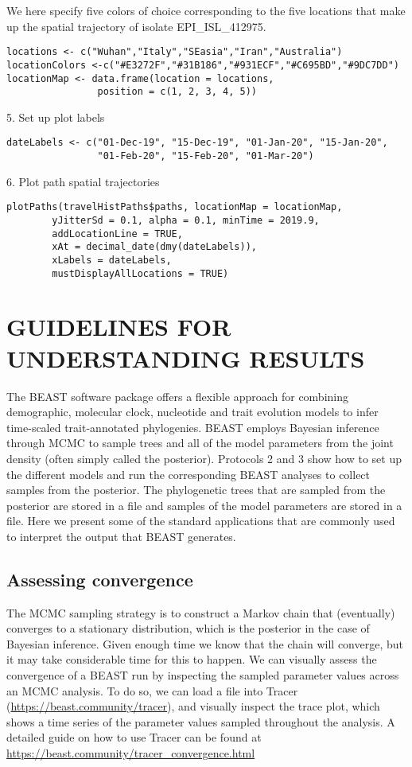 \documentclass{article}
\newcommand{\code}[1]{
{\upshape\ttfamily{#1}}}
\begin{document}
We here specify five colors of choice corresponding to the five locations that make up the spatial trajectory of isolate EPI\_ISL\_412975.

\begin{verbatim}
locations <- c("Wuhan","Italy","SEasia","Iran","Australia")
locationColors <-c("#E3272F","#31B186","#931ECF","#C695BD","#9DC7DD")
locationMap <- data.frame(location = locations,
                position = c(1, 2, 3, 4, 5))
\end{verbatim}

5. Set up plot labels
\begin{verbatim}
dateLabels <- c("01-Dec-19", "15-Dec-19", "01-Jan-20", "15-Jan-20",
                "01-Feb-20", "15-Feb-20", "01-Mar-20")
\end{verbatim}

6. Plot path spatial trajectories
\begin{verbatim}
plotPaths(travelHistPaths$paths, locationMap = locationMap,
        yJitterSd = 0.1, alpha = 0.1, minTime = 2019.9,
        addLocationLine = TRUE,
        xAt = decimal_date(dmy(dateLabels)),
        xLabels = dateLabels,
        mustDisplayAllLocations = TRUE)
\end{verbatim}

\section*{GUIDELINES FOR UNDERSTANDING RESULTS}

The BEAST software package offers a flexible approach for combining demographic, molecular clock, nucleotide and trait evolution models to infer time-scaled trait-annotated phylogenies.
BEAST employs Bayesian inference through MCMC to sample trees and all of the model parameters from the joint density (often simply called the posterior).
Protocols 2 and 3 show how to set up the different models and run the corresponding BEAST analyses to collect samples from the posterior.
The phylogenetic trees that are sampled from the posterior are stored in a\code{.trees} file and samples of the model parameters are stored in a\code{.log} file.
Here we present some of the standard applications that are commonly used to interpret the output that BEAST generates.

\subsection*{Assessing convergence}

The MCMC sampling strategy is to construct a Markov chain that (eventually) converges to a stationary distribution, which is the posterior in the case of Bayesian inference.
Given enough time we know that the chain will converge, but it may take considerable time for this to happen. We can visually assess the convergence of a BEAST run by inspecting the sampled parameter values across an MCMC analysis.
To do so, we can load a\code{.log} file into Tracer (\url{https://beast.community/tracer}), and visually inspect the trace plot, which shows a time series of the parameter values sampled throughout the analysis.
A detailed guide on how to use Tracer can be found at \url{https://beast.community/tracer_convergence.html}
\end{document}
